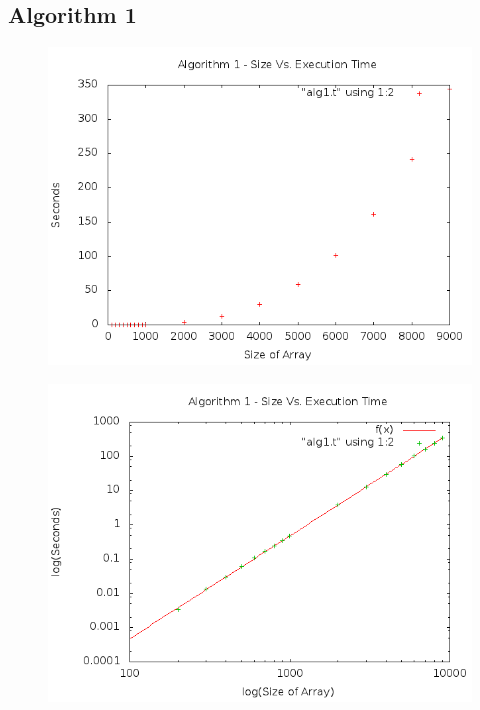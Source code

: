 \documentclass[a4paper,10pt]{article}
\begin{document}
		\subsection{Algorithm 1}
		
\begin{figure}[!htb]
\centering
\includegraphics[scale=.5]{timingfiles/alg1plot.png}
\end{figure}
\begin{figure}[!htb]
\centering
\includegraphics[scale=.5]{timingfiles/alg1plotlog.png}
\end{figure}
		\newpage
\end{document}
